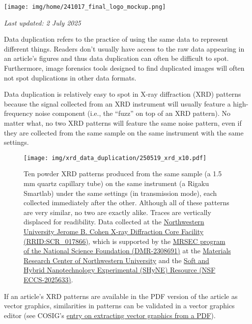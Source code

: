 \documentclass[letterpaper, 12pt]{article}
\begin{document}
\flushleft\texttt{[image: img/home/241017\_final\_logo\_mockup.png]}

\textit{Last updated: 2 July 2025}

Data duplication refers to the practice of using the same data to represent different things. Readers don't usually have access to the raw data appearing in an article's figures and thus data duplication can often be difficult to spot. Furthermore, image forensics tools designed to find duplicated images will often not spot duplications in other data formats.

Data duplication is relatively easy to spot in X-ray diffraction (XRD) patterns because the signal collected from an XRD instrument will usually feature a high-frequency noise component (i.e., the ``fuzz'' on top of an XRD pattern). No matter what, no two XRD patterns will feature the same noise pattern, even if they are collected from the same sample on the same instrument with the same settings.

\begin{figure}[h!tbp]
    \centering
    \texttt{[image: img/xrd\_data\_duplication/250519\_xrd\_x10.pdf]}
    \caption*{Ten powder XRD patterns produced from the same sample (a 1.5 mm quartz capillary tube) on the same instrument (a Rigaku Smartlab) under the same settings (in transmission mode), each collected immediately after the other. Although all of these patterns are very similar, no two are exactly alike. Traces are vertically displaced for readibility. Data collected at the \href{http://xray.facilities.northwestern.edu/}{Northwestern University Jerome B. Cohen X-ray Diffraction Core Facility (RRID:SCR\_017866)}, which is supported by the \href{https://www.nsf.gov/awardsearch/showAward?AWD_ID=2308691}{MRSEC program of the National Science Foundation (DMR-2308691)} at the \href{https://materials.northwestern.edu/}{Materials Research Center of Northwestern University} and the \href{https://shyne.northwestern.edu/}{Soft and Hybrid Nanotechnology Experimental (SHyNE) Resource (NSF ECCS-2025633)}.}
\end{figure}

If an article's XRD patterns are available in the PDF version of the article as vector graphics, similarities in patterns can be validated in a vector graphics editor (see COSIG's \href{https://osf.io/n8fvw}{entry on extracting vector graphics from a PDF}).

\pagebreak
\end{document}
